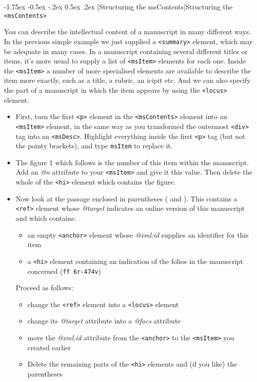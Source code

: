 \documentclass[11pt,twoside]{article}\makeatletter
\makeatletter
\renewcommand\section{\@startsection {section}{1}{\z@}%
     {-1.75ex \@plus -0.5ex \@minus -.2ex}%
     {0.5ex \@plus .2ex}%
     {\reset@font\Large\bfseries\sffamily}}
\makeatother
\begin{document}
\section[{Structuring the msContents}]{Structuring the \texttt{<msContents>}}\par
You can describe the intellectual content of a manuscript in many different ways. In the previous simple example we just supplied a \texttt{<summary>} element, which may be adequate in many cases. In a manuscript containing several different titles or items, it's more usual to supply a list of \texttt{<msItem>} elements for each one. Inside the \texttt{<msItem>} a number of more specialised elements are available to describe the item more exactly, such as a title, a rubric, an icipit etc. And we can also specify the part of a manuscript in which the item appears by using the \texttt{<locus>} element.\begin{itemize}
\item First, turn the first \texttt{<p>} element in the \texttt{<msContents>} element into an \texttt{<msItem>} element, in the same way as you transformed the outermost \texttt{<div>} tag into an \texttt{<msDesc>}. Highlight everything inside the first \texttt{<p>} tag (but not the pointy brackets), and type \texttt{msItem} to replace it.
\item The figure 1 which follows is the number of this item within the manuscript. Add an \textit{@n} attribute to your \texttt{<msItem>} and give it this value. Then delete the whole of the \texttt{<hi>} element which contains the figure.
\item Now look at the passage enclosed in parentheses ( and ). This contains a \texttt{<ref>} element whose \textit{@target} indicates an online version of this manuscript and which contains: \begin{itemize}
\item an empty \texttt{<anchor>} element whose \textit{@xml:id} supplies an identifier for this item
\item a \texttt{<hi>} element containing an indication of the folios in the manuscript concerned (\texttt{ff 6r-474v})
\end{itemize}  Proceed as follows: \begin{itemize}
\item change the \texttt{<ref>} element into a \texttt{<locus>} element
\item change its \textit{@target} attribute into a \textit{@facs} attribute
\item move the \textit{@xml:id} attribute from the \texttt{<anchor>} to the \texttt{<msItem>} you created earlier
\item Delete the remaining parts of the \texttt{<hi>} elements and (if you like) the parentheses
\end{itemize} 
\end{itemize} \par
\end{document}
